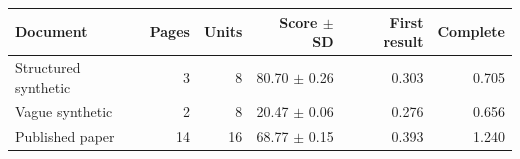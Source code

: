 \begin{tabular}{lrrr rr}
\toprule
Document & Pages & Units & Score $\pm$ SD & First result & Complete \\
\midrule
Structured synthetic & 3 & 8 & 80.70 $\pm$ 0.26 & 0.303 & 0.705 \\
Vague synthetic & 2 & 8 & 20.47 $\pm$ 0.06 & 0.276 & 0.656 \\
Published paper & 14 & 16 & 68.77 $\pm$ 0.15 & 0.393 & 1.240 \\
\bottomrule
\end{tabular}
